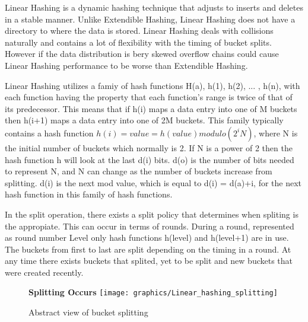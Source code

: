 \documentclass[letterpaper, 12pt]{article}
\begin{document}
Linear Hashing is a dynamic hashing technique that adjusts to inserts and deletes in a stable manner.
Unlike Extendible Hashing, Linear Hashing does not have a directory to where the data is
stored. Linear Hashing deals with collisions naturally and contains a lot of flexibility with
the timing of bucket splits. However if the data distribution is bery skewed overflow chains could cause Linear Hashing performance to be
worse than Extendible Hashing.
\par\vspace{\baselineskip}
Linear Hashing utilizes a famiy of hash functions H(a), h(1), h(2), ... , h(n), with each function having the property that each function's range is twice of that of its predecessor. This means that if h(i) maps a data entry into one of M buckets then h(i+1) maps a data entry into one of 2M buckets. This family typically contains a hash function $ h(i) = value = h(value) modulo (2^i N) $, where N is the initial number of buckets which normally is 2. If N is a power of 2 then the hash function h will look at the last d(i) bits. d(o) is the number of bits needed to represent N, and N can change as the number of buckets increase from splitting. d(i) is the next mod value, which is equal to d(i) = d(a)+i, for the next hash function in this family of hash functions.
\par\vspace{\baselineskip}
In the split operation, there exists a split policy that determines when spliting is the appropiate. This can occur in terms of rounds. During a round, represented as round number Level only hash functions h(level) and h(level+1) are in use. The buckets from first to last are split depending on the timing in a round. At any time there exists buckets that splited, yet to be split and new buckets that were created recently.
\par\vspace{\baselineskip}
\begin{figure}
  \centering
  \textbf{Splitting Occurs}
  \texttt{[image: graphics/Linear\_hashing\_splitting]}
  \caption{Abstract view of bucket splitting}
\end{figure}
\end{document}

